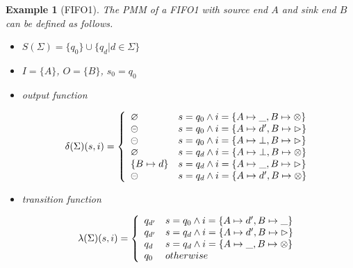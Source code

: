 \documentclass[conference, a4paper]{IEEEtran}
\newtheorem{example}{Example}
\newcommand{\rblock}[0]{\circleddash}
\newcommand{\rread}[0]{\rhd}
\newcommand{\rnoread}[0]{\otimes}
\newcommand{\rempty}[0]{\varnothing}
\begin{document}
\begin{example}[FIFO1]
  \label{example:pmmfifo}
  The PMM of a FIFO1 with source end $A$ and sink end $B$ can be defined as follows.
  \begin{itemize}
    \item[-] $S(\Sigma)=\{q_0\}\cup\{q_d|d\in\Sigma\}$
    \item[-] $I=\{A\}$, $O=\{B\}$, $s_0=q_0$
    \item[-] output function
      \begin{small}
        \begin{displaymath}
          \delta(\Sigma)(s,i)=\left\{
          \begin{array}[ht]{ll}
            \rempty & s=q_0\land i=\{A\mapsto\_,B\mapsto\rnoread\} \\
            \rblock & s=q_0\land i=\{A\mapsto d',B\mapsto\rread\} \\
            \rblock & s=q_0\land i=\{A\mapsto\bot,B\mapsto\rread\} \\
            \rempty & s=q_d\land i=\{A\mapsto\bot,B\mapsto\rnoread\} \\     
            \{B\mapsto d\} & s=q_d\land i=\{A\mapsto\_,B\mapsto\rread\}\\
            \rblock & s=q_d\land i=\{A\mapsto d',B\mapsto \rnoread\} \\
          \end{array}
          \right.
        \end{displaymath}
      \end{small}
    \item[-] transition function
      \begin{small}
        \begin{displaymath}
          \lambda(\Sigma)(s,i)=\left\{
          \begin{array}[ht]{ll}
            q_{d'} & s=q_0\land i=\{A\mapsto d',B\mapsto\_\} \\
            q_{d'} & s=q_{d}\land i=\{A\mapsto d',B\mapsto \rread\} \\
            q_{d} & s=q_{d}\land i=\{A\mapsto \_,B\mapsto \rnoread\} \\
            q_0 & otherwise \\
          \end{array}
          \right.
        \end{displaymath}
      \end{small}
  \end{itemize}
\end{example}
\end{document}
